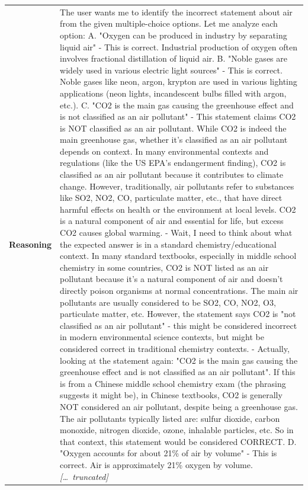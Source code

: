 \begin{longtable}{@{}l p{13cm}@{}}
  \textbf{Reasoning} & The user wants me to identify the incorrect statement about air from the given multiple-choice options. \newline Let me analyze each option: \newline A. "Oxygen can be produced in industry by separating liquid air" \newline - This is correct. Industrial production of oxygen often involves fractional distillation of liquid air. \newline B. "Noble gases are widely used in various electric light sources" \newline - This is correct. Noble gases like neon, argon, krypton are used in various lighting applications (neon lights, incandescent bulbs filled with argon, etc.). \newline C. "CO2 is the main gas causing the greenhouse effect and is not classified as an air pollutant" \newline - This statement claims CO2 is NOT classified as an air pollutant. While CO2 is indeed the main greenhouse gas, whether it's classified as an air pollutant depends on context. In many environmental contexts and regulations (like the US EPA's endangerment finding), CO2 is classified as an air pollutant because it contributes to climate change. However, traditionally, air pollutants refer to substances like SO2, NO2, CO, particulate matter, etc., that have direct harmful effects on health or the environment at local levels. CO2 is a natural component of air and essential for life, but excess CO2 causes global warming. \newline - Wait, I need to think about what the expected answer is in a standard chemistry/educational context. In many standard textbooks, especially in middle school chemistry in some countries, CO2 is NOT listed as an air pollutant because it's a natural component of air and doesn't directly poison organisms at normal concentrations. The main air pollutants are usually considered to be SO2, CO, NO2, O3, particulate matter, etc. However, the statement says CO2 is "not classified as an air pollutant" - this might be considered incorrect in modern environmental science contexts, but might be considered correct in traditional chemistry contexts. \newline - Actually, looking at the statement again: "CO2 is the main gas causing the greenhouse effect and is not classified as an air pollutant". If this is from a Chinese middle school chemistry exam (the phrasing suggests it might be), in Chinese textbooks, CO2 is generally NOT considered an air pollutant, despite being a greenhouse gas. The air pollutants typically listed are: sulfur dioxide, carbon monoxide, nitrogen dioxide, ozone, inhalable particles, etc. So in that context, this statement would be considered CORRECT. \newline D. "Oxygen accounts for about 21\% of air by volume" \newline - This is correct. Air is approximately 21\% oxygen by volume. \newline \textit{[\ldots\ truncated]}  \\

\end{longtable}
